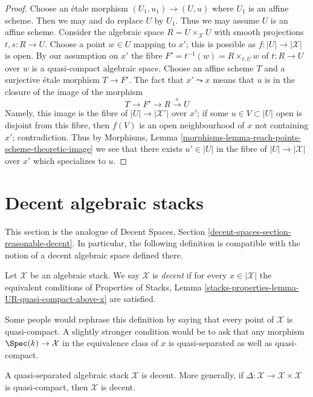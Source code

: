 \begin{proof}
Choose an \'etale morphism $(U_1, u_1) \to (U, u)$ where $U_1$
is an affine scheme. Then we may and do replace $U$ by $U_1$.
Thus we may assume $U$ is an affine scheme.
Consider the algebraic space $R = U \times_\mathcal{X} U$
with smooth projections $t, s : R \to U$.
Choose a point $w \in U$ mapping to $x'$; this is possible as
$f : |U| \to |\mathcal{X}|$ is open.
By our assumption on $x'$ the fibre
$F' = t^{-1}(w) = R \times_{t, U} w$
of $t : R \to U$ over $w$ is a quasi-compact algebraic space.
Choose an affine scheme $T$ and a surjective \'etale morphism
$T \to F'$. The fact that $x' \leadsto x$ means that $u$ is in
the closure of the image of the morphism
$$
T \to F' \to R \xrightarrow{s} U
$$
Namely, this image is the fibre of $|U| \to |\mathcal{X}'|$
over $x'$; if some $u \in V \subset |U|$ open is disjoint
from this fibre, then $f(V)$ is an open neighbourhood of $x$
not containing $x'$; contradiction.
Thus by Morphisms, Lemma
\ref{morphisms-lemma-reach-points-scheme-theoretic-image}
we see that  there exists $u' \in |U|$ in the fibre
of $|U| \to |\mathcal{X}|$ over $x'$ which specializes to $u$.
\end{proof}



\section{Decent algebraic stacks}
\label{section-reasonable-decent}

\noindent
This section is the analogue of
Decent Spaces, Section \ref{decent-spaces-section-reasonable-decent}.
In particular, the following definition is compatible with
the notion of a decent algebraic space defined there.

\begin{definition}
\label{definition-decent}
Let $\mathcal{X}$ be an algebraic stack. We say $\mathcal{X}$ is {\it decent}
if for every $x \in |\mathcal{X}|$ the equivalent conditions of
Properties of Stacks, Lemma
\ref{stacks-properties-lemma-UR-quasi-compact-above-x} are satisfied.
\end{definition}

\noindent
Some people would rephrase this definition by saying that
every point of $\mathcal{X}$ is quasi-compact.
A slightly stronger condition would be to ask that any morphism
$\Spec(k) \to \mathcal{X}$ in the equivalence class of $x$ is
quasi-separated as well as quasi-compact.

\begin{lemma}
\label{lemma-quasi-separated-decent}
A quasi-separated algebraic stack $\mathcal{X}$ is decent.
More generally, if $\Delta : \mathcal{X} \to \mathcal{X} \times \mathcal{X}$
is quasi-compact, then $\mathcal{X}$ is decent.
\end{lemma}


